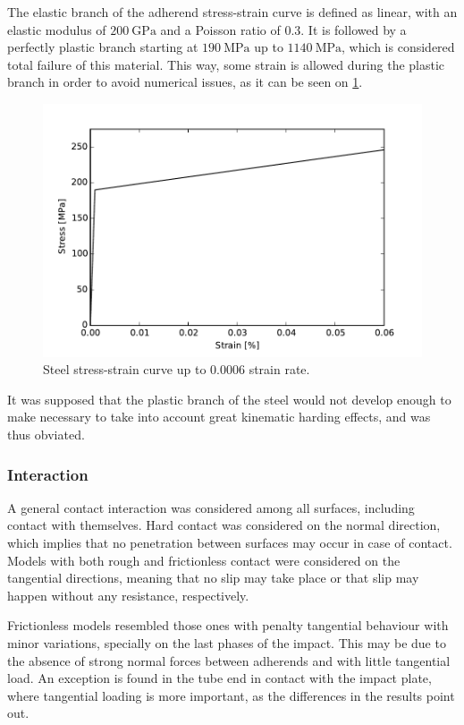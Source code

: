 \documentclass[cmfonts]{witpress}
\begin{document}
The elastic branch of the adherend stress-strain curve is defined as linear, with an elastic modulus of $\SI{200}{\GPa}$ and a Poisson ratio of $\num{0.3}$. It is followed by a perfectly plastic branch starting at $\SI{190}{\MPa}$ up to $\SI{1140}{\MPa}$, which is considered total failure of this material. This way, some strain is allowed during the plastic branch in order to avoid numerical issues, as it can be seen on \cref{fig:steel}.

\begin{figure}
	\centering
	\includegraphics[width=0.7\linewidth]{figures/IMG_CUTRES/steel}
	\caption{Steel stress-strain curve up to $\num{0.0006}$ strain rate.}
	\label{fig:steel}
\end{figure}

It was supposed that the plastic branch of the steel would not develop enough to make necessary to take into account great kinematic harding effects, and was thus obviated.

\subsubsection{Interaction}

A general contact interaction was considered among all surfaces, including contact with themselves. Hard contact was considered on the normal direction, which implies that no penetration between surfaces may occur in case of contact. Models with both rough and frictionless contact were considered on the tangential directions, meaning that no slip may take place or that slip may happen without any resistance, respectively.

Frictionless models resembled those ones with penalty tangential behaviour with minor variations, specially on the last phases of the impact. This may be due to the absence of strong normal forces between adherends and with little tangential load. An exception is found in the tube end in contact with the impact plate, where tangential loading is more important, as the differences in the results point out.
\end{document}
